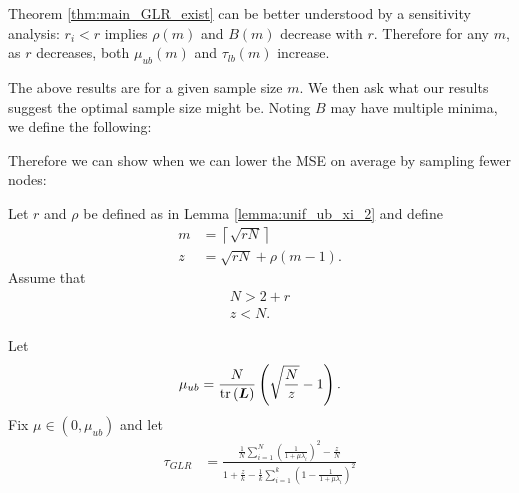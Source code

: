 {\iffalse
Theorem \ref{thm:main_GLR_exist} can be better understood by a sensitivity analysis: $r_{i} < r$ implies $\rho(m)$ and $B(m)$ decrease with $r$.
Therefore for any $m$, as $r$ decreases, both $\mu_{ub}(m)$ and $\tau_{lb}(m)$ increase.
    

The above results are for a given sample size $m$. We then ask what our results suggest the optimal sample size might be. Noting $B$ may have multiple minima, %
we define the following:

\iffalse
Therefore we can show when we can lower the MSE on average by sampling fewer nodes:

\begin{theorem}
\label{thm:main_GLR}
Let $r$ and $\rho$ be defined as in Lemma \ref{lemma:unif_ub_xi_2} and define
    \begin{align}
        m &= \left\lceil \sqrt{rN} \right\rceil \\
        z &= \sqrt{rN} + \rho(m-1).
    \end{align}
    Assume that
   \begin{align}
    N > 2+r \\
     z < N. \label{eq:GLR_b_constraint}
\end{align}
 
    Let 
    \begin{align}
        \mu_{ub} = \frac{N}{\textrm{tr}\left(\bm{L}\right)} \left( \sqrt{\frac{N}{z}}  -1 \right). \label{eq:mu_constraint_GLR}
        \end{align}
    Fix $\mu \in (0, \mu_{ub})$ and let 
        \begin{align}
        \tau_{GLR} &= \frac{\frac{1}{N}\sum_{i=1}^{N}\left(\frac{1}{1 + \mu \lambda_{i}}\right)^{2} - \frac{z}{N}}{1 + \frac{z}{k} - \frac{1}{k}\sum_{i=1}^{k}\left( 1 - \frac{1}{1 + \mu \lambda_{i}}\right)^{2} }
    \end{align}
    

\end{theorem}}
